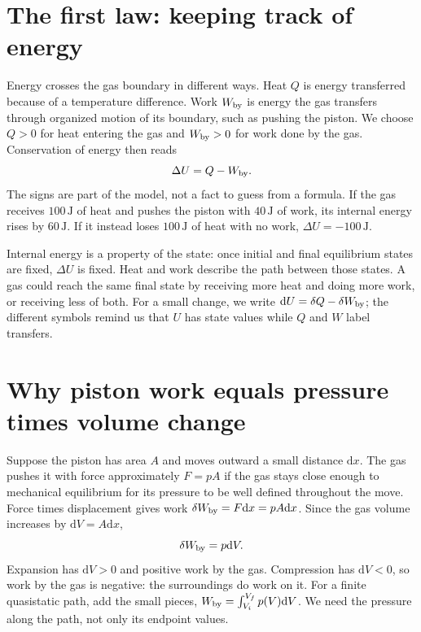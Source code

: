 \documentclass[11pt,oneside]{book}
\newcommand{\dd}{\mathrm{d}}
\theoremstyle{reviewstyle}
\begin{document}
\section{The first law: keeping track of energy}
Energy crosses the gas boundary in different ways. Heat $Q$ is energy transferred because of a temperature difference. Work $W_{\rm by}$ is energy the gas transfers through organized motion of its boundary, such as pushing the piston. We choose $Q>0$ for heat entering the gas and $W_{\rm by}>0$ for work done by the gas. Conservation of energy then reads
\begin{equation}
\Delta U=Q-W_{\rm by}.
\label{eq:first-law-book}
\end{equation}
The signs are part of the model, not a fact to guess from a formula. If the gas receives $100\,\mathrm J$ of heat and pushes the piston with $40\,\mathrm J$ of work, its internal energy rises by $60\,\mathrm J$. If it instead loses $100\,\mathrm J$ of heat with no work, $\Delta U=-100\,\mathrm J$.

Internal energy is a property of the state: once initial and final equilibrium states are fixed, $\Delta U$ is fixed. Heat and work describe the path between those states. A gas could reach the same final state by receiving more heat and doing more work, or receiving less of both. For a small change, we write $\dd U=\delta Q-\delta W_{\rm by}$; the different symbols remind us that $U$ has state values while $Q$ and $W$ label transfers.

\section{Why piston work equals pressure times volume change}
Suppose the piston has area $A$ and moves outward a small distance $\dd x$. The gas pushes it with force approximately $F=pA$ if the gas stays close enough to mechanical equilibrium for its pressure to be well defined throughout the move. Force times displacement gives work $\delta W_{\rm by}=F\dd x=pA\dd x$. Since the gas volume increases by $\dd V=A\dd x$,
\begin{equation}
\delta W_{\rm by}=p\dd V.
\end{equation}
Expansion has $\dd V>0$ and positive work by the gas. Compression has $\dd V<0$, so work by the gas is negative: the surroundings do work on it. For a finite quasistatic path, add the small pieces, $W_{\rm by}=\int_{V_i}^{V_f}p(V)\dd V$. We need the pressure along the path, not only its endpoint values.
\end{document}
